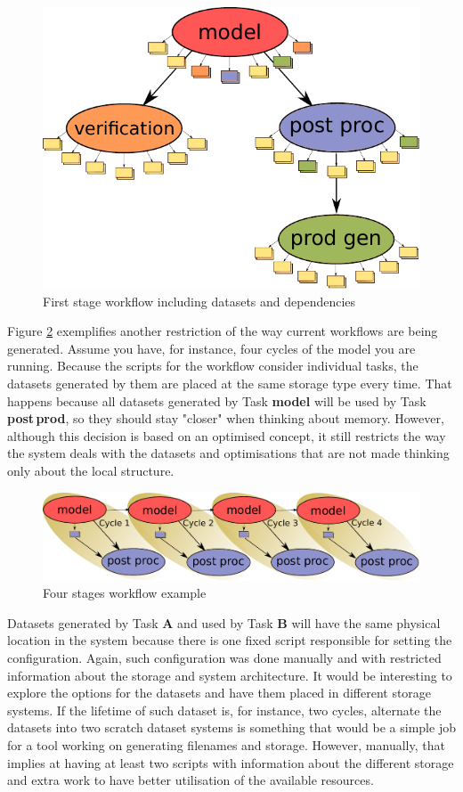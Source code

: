 \documentclass[a4paper]{article}
\begin{document}
\begin{figure}[H]
  \centering
  \includegraphics[width=0.6\columnwidth]{cycle-io-dep}
  \caption{First stage workflow including datasets and dependencies}
  \label{fig:cycle-io-dep}
\end{figure}

Figure \ref{fig:cycle-4} exemplifies another restriction of the way current workflows are being generated. Assume you have, for instance, four cycles of the model you are running. Because the scripts for the workflow consider individual tasks, the datasets generated by them are placed at the same storage type every time. That happens because all datasets generated by Task \textbf{model} will be used by Task \textbf{post\,prod}, so they should stay "closer" when thinking about memory. However, although this decision is based on an optimised concept, it still restricts the way the system deals with the datasets and optimisations that are not made thinking only about the local structure.

\begin{figure}[H]
  \centering
  \includegraphics[width=0.8\columnwidth]{cycle-4}
  \caption{Four stages workflow example}
  \label{fig:cycle-4}
\end{figure}

Datasets generated by Task \textbf{A} and used by Task \textbf{B} will have the same physical location in the system because there is one fixed script responsible for setting the configuration. Again, such configuration was done manually and with restricted information about the storage and system architecture. It would be interesting to explore the options for the datasets and have them placed in different storage systems. If the lifetime of such dataset is, for instance, two cycles, alternate the datasets into two scratch dataset systems is something that would be a simple job for a tool working on generating filenames and storage. However, manually, that implies at having at least two scripts with information about the different storage and extra work to have better utilisation of the available resources.
\end{document}
